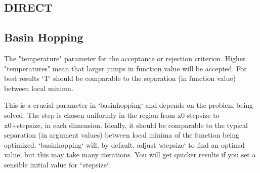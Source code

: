 \subsection{DIRECT}

\subsection{Basin Hopping}
The "temperature" parameter for the acceptance or rejection criterion.
Higher "temperatures" mean that larger jumps in function value will be
accepted.  For best results `T` should be comparable to the
separation (in function value) between local minima.

This is a crucial parameter in `basinhopping` and
depends on the problem being solved. The step is chosen uniformly in the
region from x0-stepsize to x0+stepsize, in each dimension. Ideally, it
should be comparable to the typical separation (in argument values) between
local minima of the function being optimized. `basinhopping` will, by
default, adjust `stepsize` to find an optimal value, but this may take
many iterations. You will get quicker results if you set a sensible
initial value for ``stepsize``.